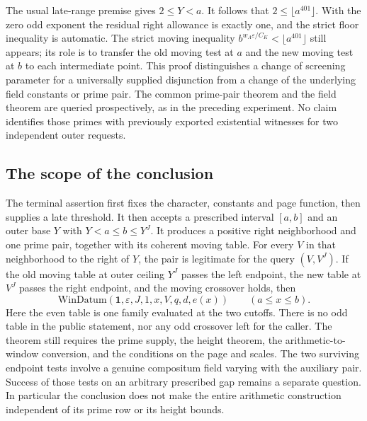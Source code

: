 \documentclass[12pt,letterpaper]{article}
\begin{document}
The usual late-range premise gives \(2\le Y<a\). It follows that \(2\le\lfloor a^{401}\rfloor\). With the zero odd exponent the residual right allowance is exactly one, and the strict floor inequality is automatic. The strict moving inequality \(b^{w_A\varepsilon/C_K}<\lfloor a^{401}\rfloor\) still appears; its role is to transfer the old moving test at \(a\) and the new moving test at \(b\) to each intermediate point. This proof distinguishes a change of screening parameter for a universally supplied disjunction from a change of the underlying field constants or prime pair. The common prime-pair theorem and the field theorem are queried prospectively, as in the preceding experiment. No claim identifies those primes with previously exported existential witnesses for two independent outer requests.

\subsection{The scope of the conclusion}

The terminal assertion first fixes the character, constants and page function, then supplies a late threshold. It then accepts a prescribed interval \([a,b]\) and an outer base \(Y\) with \(Y<a\le b\le Y^J\). It produces a positive right neighborhood and one prime pair, together with its coherent moving table. For every \(V\) in that neighborhood to the right of \(Y\), the pair is legitimate for the query \((V,V^J)\). If the old moving table at outer ceiling \(Y^J\) passes the left endpoint, the new table at \(V^J\) passes the right endpoint, and the moving crossover holds, then
\[
   \mathrm{WinDatum}(\mathbf 1,\varepsilon,J,1,x,V,q,d,e(x))
         \qquad(a\le x\le b).
\]
Here the even table is one family evaluated at the two cutoffs. There is no odd table in the public statement, nor any odd crossover left for the caller. The theorem still requires the prime supply, the height theorem, the arithmetic-to-window conversion, and the conditions on the page and scales. The two surviving endpoint tests involve a genuine compositum field varying with the auxiliary pair. Success of those tests on an arbitrary prescribed gap remains a separate question. In particular the conclusion does not make the entire arithmetic construction independent of its prime row or its height bounds.
\end{document}
